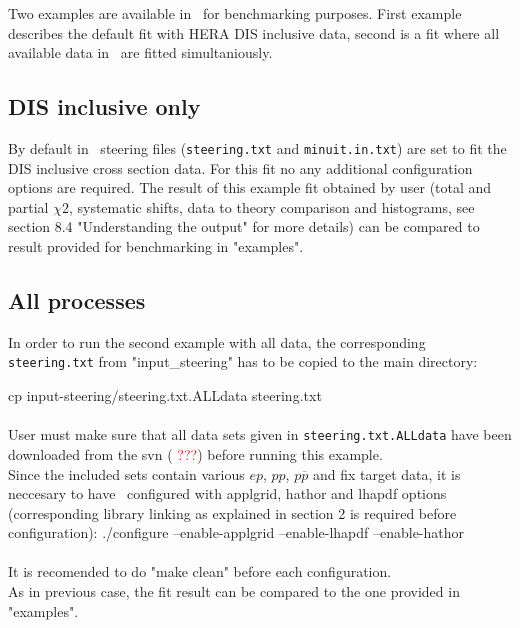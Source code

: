 
\label{section:example}
Two examples are available in \fitter\ for benchmarking purposes.
First example describes the default fit with HERA DIS inclusive data,
second is a fit where all available data in \fitter\ are fitted simultaniously.

\subsection{DIS inclusive only}
By default in \fitter\ steering files ({\tt steering.txt} and {\tt minuit.in.txt})
are set to fit the DIS inclusive cross section data. For this fit no any additional
configuration options are required.
The result of this example fit obtained by user (total and partial $\chi2$, systematic shifts, 
data to theory comparison and histograms, see section 8.4 "Understanding the output" for more details) 
can be compared to result provided for benchmarking in "examples".

\subsection{All processes}
In order to run the second example with all data, the corresponding
{\tt steering.txt} from "input\_steering" has to be copied to the main directory:

\goodbreak                 
cp input-steering/steering.txt.ALLdata steering.txt
\\ \\
User must make sure that all data sets given in {\tt steering.txt.ALLdata} 
have been downloaded from the svn (\textcolor{red}{ ???}) before running this example. 
\\
Since the included sets contain various $ep$, $pp$, $p \overline p$ and fix target
data, it is neccesary to have \fitter\ configured with applgrid, hathor and 
lhapdf options (corresponding library linking as explained in section 2 is
required before configuration): 
\goodbreak
./configure --enable-applgrid --enable-lhapdf --enable-hathor
\\ \\
It is recomended to do "make clean" before each configuration. \\        
As in previous case, the fit result can be compared to the one provided in "examples".



